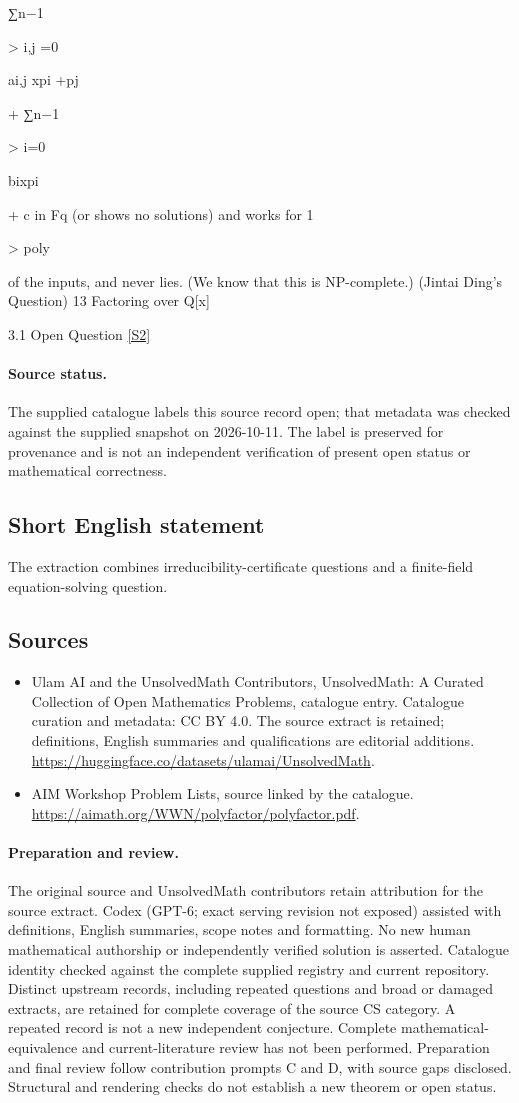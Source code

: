 \documentclass[11pt]{article}
\newcommand{\sref}[2]{\hyperlink{source:#1:#2}{[S#2]}}
\begin{document}
∑n−1

> i,j =0

ai,j xpi +pj

+ ∑n−1

> i=0

bixpi

+ c in Fq (or shows no solutions) and works for 1

> poly

of the inputs, and never lies. (We know that this is NP-complete.) (Jintai Ding's Question) 13 Factoring over Q[x]

3.1 Open
Question \sref{statement}{2}
\paragraph{Source status.}
The supplied catalogue labels this source record open; that metadata was checked against the supplied snapshot on 2026-10-11. The label is preserved for provenance and is not an independent verification of present open status or mathematical correctness.
\subsection{Short English statement}
The extraction combines irreducibility-certificate questions and a finite-field equation-solving question.
\subsection{Sources}
\begin{itemize}
\item[\hypertarget{source:statement:1}{S1}] Ulam AI and the UnsolvedMath Contributors, UnsolvedMath: A Curated Collection of Open Mathematics Problems, catalogue entry. Catalogue curation and metadata: CC BY 4.0. The source extract is retained; definitions, English summaries and qualifications are editorial additions.
\url{https://huggingface.co/datasets/ulamai/UnsolvedMath}.
\item[\hypertarget{source:statement:2}{S2}] AIM Workshop Problem Lists, source linked by the catalogue.
\url{https://aimath.org/WWN/polyfactor/polyfactor.pdf}.
\end{itemize}
\paragraph{Preparation and review.}
The original source and UnsolvedMath contributors retain attribution for the source extract. Codex (GPT-6; exact serving revision not exposed) assisted with definitions, English summaries, scope notes and formatting. No new human mathematical authorship or independently verified solution is asserted. Catalogue identity checked against the complete supplied registry and current repository. Distinct upstream records, including repeated questions and broad or damaged extracts, are retained for complete coverage of the source CS category. A repeated record is not a new independent conjecture. Complete mathematical-equivalence and current-literature review has not been performed. Preparation and final review follow contribution prompts C and D, with source gaps disclosed. Structural and rendering checks do not establish a new theorem or open status.
\label{end:statement}
\end{document}
